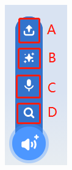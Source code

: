 \documentclass[10pt, a4paper]{article}
\begin{document}
\begin{enumerate}
\begin{figure}[htbp]
\begin{minipage}[t]{.06\textwidth}
                \includegraphics[width=\textwidth]{4.png}

\end{minipage}
\end{figure}
\end{enumerate}
\end{document}
